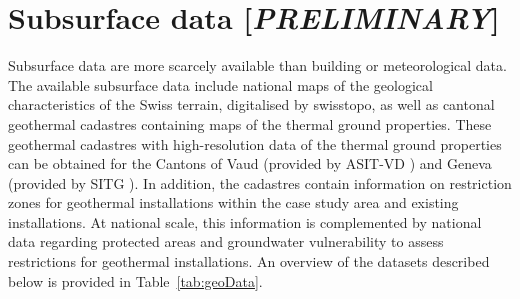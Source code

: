 \section{Subsurface data [\textit{PRELIMINARY}]}
\label{data_geo}

Subsurface data are more scarcely available than building or meteorological data. 
The available subsurface data include national maps of the geological characteristics of the Swiss terrain, digitalised by swisstopo, as well as cantonal geothermal cadastres containing maps of the thermal ground properties. 
These geothermal cadastres with high-resolution data of the thermal ground properties can be obtained for the Cantons of Vaud (provided by ASIT-VD \cite{asit_vd_cadastre_2019-1}) and Geneva (provided by SITG \cite{sitg_cadastre_2019}). 
In addition, the cadastres contain information on restriction zones for geothermal installations within the case study area and existing installations.
At national scale, this information is complemented by national data regarding protected areas and groundwater vulnerability to assess restrictions for geothermal installations.
An overview of the datasets described below is provided in Table~\ref{tab:geoData}.

